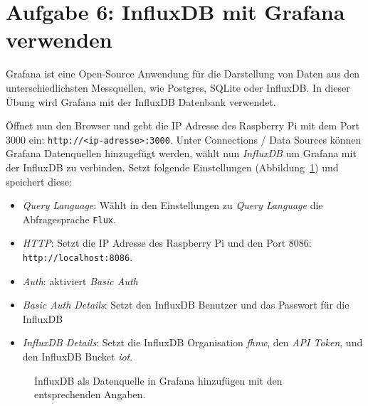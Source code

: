 \documentclass[
  11pt,
  a4paper,
  oneside, openany  ,captions=tableheading
]{scrbook}
\providecommand{\tightlist}{%
  \setlength{\itemsep}{0pt}\setlength{\parskip}{0pt}}
\theoremstyle{remark}
\renewcommand{\markright}[1]{\def\chaptertitle{#1}} %
\begin{document}
\section*{Aufgabe 6: InfluxDB mit Grafana
verwenden}\label{aufgabe-6-influxdb-mit-grafana-verwenden}

\markright{Aufgabe 6: InfluxDB mit Grafana verwenden}

Grafana ist eine Open-Source Anwendung für die Darstellung von Daten aus
den unterschiedlichsten Messquellen, wie Postgres, SQLite oder InfluxDB.
In dieser Übung wird Grafana mit der InfluxDB Datenbank verwendet.

Öffnet nun den Browser und gebt die IP Adresse des Raspberry Pi mit dem
Port 3000 ein: \texttt{http://\textless{}ip-adresse\textgreater{}:3000}.
Unter Connections / Data Sources können Grafana Datenquellen hinzugefügt
werden, wählt nun \emph{InfluxDB} um Grafana mit der InfluxDB zu
verbinden. Setzt folgende Einstellungen
(Abbildung~\ref{fig-grafanainfluxdb}) und speichert diese:

\begin{itemize}
\tightlist
\item
  \emph{Query Language}: Wählt in den Einstellungen zu \emph{Query
  Language} die Abfragesprache \texttt{Flux}.
\item
  \emph{HTTP}: Setzt die IP Adresse des Raspberry Pi und den Port 8086:
  \texttt{http://localhost:8086}.
\item
  \emph{Auth}: aktiviert \emph{Basic Auth}
\item
  \emph{Basic Auth Details}: Setzt den InfluxDB Benutzer und das
  Passwort für die InfluxDB
\item
  \emph{InfluxDB Details}: Setzt die InfluxDB Organisation \emph{fhnw},
  den \emph{API Token}, und den InfluxDB Bucket \emph{iot}.
\end{itemize}

\begin{figure}


\caption{\label{fig-grafanainfluxdb}InfluxDB als Datenquelle in Grafana
hinzufügen mit den entsprechenden Angaben.}

\end{figure}%
\end{document}
